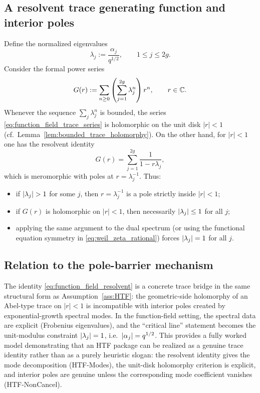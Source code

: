 \subsection{A resolvent trace generating function and interior poles}
Define the normalized eigenvalues
\[
\lambda_j:=\frac{\alpha_j}{q^{1/2}},
\qquad 1\le j\le 2g.
\]
Consider the formal power series
\begin{equation}
\label{eq:function_field_trace_series}
G(r):=\sum_{n\ge 0}\left(\sum_{j=1}^{2g}\lambda_j^n\right) r^n,
\qquad r\in\mathbb{C}.
\end{equation}
Whenever the sequence $\sum_j\lambda_j^n$ is bounded, the series \eqref{eq:function_field_trace_series} is holomorphic on the unit disk $|r|<1$ (cf.\ Lemma~\ref{lem:bounded_trace_holomorphy}).
On the other hand, for $|r|<1$ one has the resolvent identity
\begin{equation}
\label{eq:function_field_resolvent}
G(r)=\sum_{j=1}^{2g}\frac{1}{1-r\lambda_j},
\end{equation}
which is meromorphic with poles at $r=\lambda_j^{-1}$.
Thus:
\begin{itemize}
\item if $\left\lvert \lambda_j\right\rvert>1$ for some $j$, then $r=\lambda_j^{-1}$ is a pole strictly inside $|r|<1$;
\item if $G(r)$ is holomorphic on $|r|<1$, then necessarily $\left\lvert \lambda_j\right\rvert\le 1$ for all $j$;
\item applying the same argument to the dual spectrum (or using the functional equation symmetry in \eqref{eq:weil_zeta_rational}) forces $\left\lvert \lambda_j\right\rvert=1$ for all $j$.
\end{itemize}

\subsection{Relation to the pole-barrier mechanism}
The identity \eqref{eq:function_field_resolvent} is a concrete trace bridge in the same structural form as Assumption~\ref{ass:HTF}:
the geometric-side holomorphy of an Abel-type trace on $|r|<1$ is incompatible with interior poles created by exponential-growth spectral modes.
In the function-field setting, the spectral data are explicit (Frobenius eigenvalues), and the ``critical line'' statement becomes the unit-modulus constraint $\left\lvert \lambda_j\right\rvert=1$, i.e.\ $\left\lvert \alpha_j\right\rvert=q^{1/2}$.
This provides a fully worked model demonstrating that an HTF package can be realized as a genuine trace identity rather than as a purely heuristic slogan:
the resolvent identity gives the mode decomposition (HTF-Modes), the unit-disk holomorphy criterion is explicit, and interior poles are genuine unless the corresponding mode coefficient vanishes (HTF-NonCancel).

